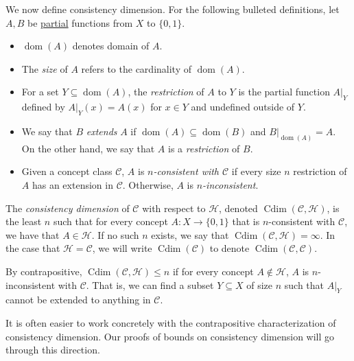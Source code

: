 \documentclass[runningheads]{llncs}
\newcommand{\mc}{\mathcal}
\DeclareMathOperator{\dom}{dom}
\DeclareMathOperator{\Cdim}{Cdim}
\DeclareMathOperator{\SCdim}{SCdim}
\begin{document}
We now define consistency dimension.
For the following bulleted definitions, let $A,B$ be \underline{partial} functions from $X$ to $\{0,1\}$.
\begin{itemize}
    \item $\dom(A)$ denotes domain of $A$.
    \item The \emph{size} of $A$ refers to the cardinality of $\dom(A)$.
    \item For a set $Y \subseteq \dom(A)$, the \emph{restriction} of $A$ to $Y$ is the partial function $A|_Y$ defined by $A|_Y(x) = A(x)$ for $x \in Y$ and undefined outside of $Y$.
    \item We say that $B$ \emph{extends} $A$ if $\dom(A) \subseteq \dom(B)$ and $B|_{\dom(A)} = A$. 
    On the other hand, we say that $A$ is a \emph{restriction} of $B$. 
    \item Given a concept class $\mc C$, $A$ is \emph{$n$-consistent with $\mc C$} if every size $n$ restriction of $A$ has an extension in $\mc C$. 
    Otherwise, $A$ is \emph{$n$-inconsistent}. 
\end{itemize}

\begin{definition}
    The \emph{consistency dimension} of $\mc C$ with respect to $\mc H$, denoted $\Cdim(\mc C, \mc H)$, is the least $n$ such that for every concept $A : X \to \{0,1\}$ that is $n$-consistent with $\mc C$, we have that $A \in \mc H$. 
    If no such $n$ exists, we say that $\Cdim(\mc C, \mc H) = \infty$. 
    In the case that $\mc H = \mc C$, we will write $\Cdim(\mc C)$ to denote $\Cdim(\mc C, \mc C)$. 
\end{definition}

\begin{remark}
    By contrapositive, $\Cdim(\mc C, \mc H) \leq n$ if for every concept $A \notin \mc H$, $A$ is $n$-inconsistent with $\mc C$. That is, we can find a subset $Y \subseteq X$ of size $n$ such that $A|_Y$ cannot be extended to anything in $\mc C$. 
\end{remark}

It is often easier to work concretely with the contrapositive characterization of consistency dimension. 
Our proofs of bounds on consistency dimension will go through this direction.

\end{document}
